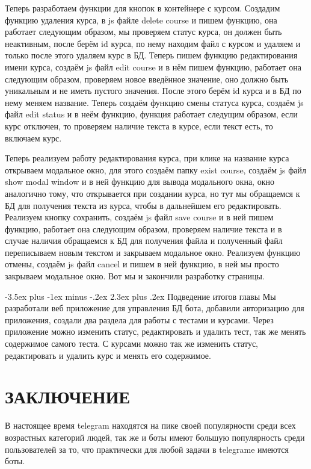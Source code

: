 \documentclass[12pt, oldlfont, amsfonts]{report}
\makeatletter
\renewcommand{\section}{\@startsection{section}{1}{0pt}%
                                {-3.5ex plus -1ex minus -.2ex}%
                                {2.3ex plus .2ex}%
{\centering\hyphenpenalty=10000\normalfont\Large\bfseries}}
\makeatother
\begin{document}
Теперь разработаем функции для кнопок в контейнере с курсом. Создадим функцию удаления курса, в js файле { delete course} и пишем функцию, она работает следующим образом, мы проверяем статус курса, он должен быть неактивным, после берём { id} курса, по нему находим файл с курсом и удаляем и только после этого удаляем курс в БД. Теперь пишем функцию редактирования имени курса, создаём js файл { edit course} и в нём пишем функцию, работает она следующим образом, проверяем новое введённое значение, оно должно быть уникальным и не иметь пустого значения. После этого берём id курса и в БД по нему меняем название. Теперь создаём функцию смены статуса курса, создаём js файл { edit status} и в неём функцию, функция работает следущим образом, если курс отключен, то проверяем наличие текста в курсе, если текст есть, то включаем курс.

Теперь реализуем работу редактирования курса, при клике на название курса открываем модальное окно, для этого создаём папку { exist course}, создаём js файл { show modal window} и в ней функцию для вывода модального окна, окно аналогично тому, что открывается при создании курса, но тут мы обращаемся к БД для получения текста из курса, чтобы в дальнейшем его редактировать. Реализуем кнопку сохранить, создаём js файл { save course} и в ней пишем функцию, работает она следующим образом, проверяем наличие текста и в случае наличия обращаемся к БД для получения файла и полученный файл переписываем новым текстом и закрываем модальное окно. Реализуем функцию отмены, создаём js файл { cancel} и пишем в ней функцию, в ней мы просто закрываем модальное окно. Вот мы и закончили разработку страницы.


\section{Подведение итогов главы}
Мы разработали веб приложение для управления БД бота, добавили авторизацию для приложения, создали два раздела для работы с тестами и курсами. Через приложение можно изменить статус, редактировать и удалить тест, так же менять содержимое самого теста. С курсами можно так же изменить статус, редактировать и удалить курс и менять его содержимое.

\chapter*{\large{{ЗАКЛЮЧЕНИЕ}}}
В настоящее время telegram находятся на пике своей популярности среди всех возрастных категорий людей, так же и боты имеют большую популярность среди пользователей за то, что практически для любой задачи в telegrame имеются боты.
\end{document}
